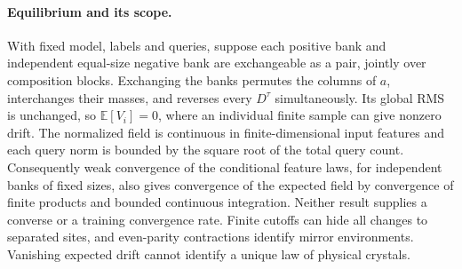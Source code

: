 \paragraph{Equilibrium and its scope.}
With fixed model, labels and queries, suppose each positive bank and independent
equal-size negative bank are exchangeable as a pair, jointly over composition blocks.
Exchanging the banks permutes the columns of $a$, interchanges their masses, and reverses
every $D^\tau$ simultaneously. Its global RMS is unchanged, so $\mathbb E[V_i]=0$,
where an individual finite sample can give nonzero drift. The normalized field is
continuous in finite-dimensional input features and each query norm is bounded by the
square root of the total query count. Consequently weak convergence of the conditional
feature laws, for independent banks of fixed sizes, also gives convergence of the
expected field by convergence of finite products and bounded continuous integration.
Neither result supplies a converse or a training convergence rate. Finite cutoffs can
hide all changes to separated sites, and even-parity contractions identify mirror
environments. Vanishing expected drift cannot identify a unique law of physical crystals.
